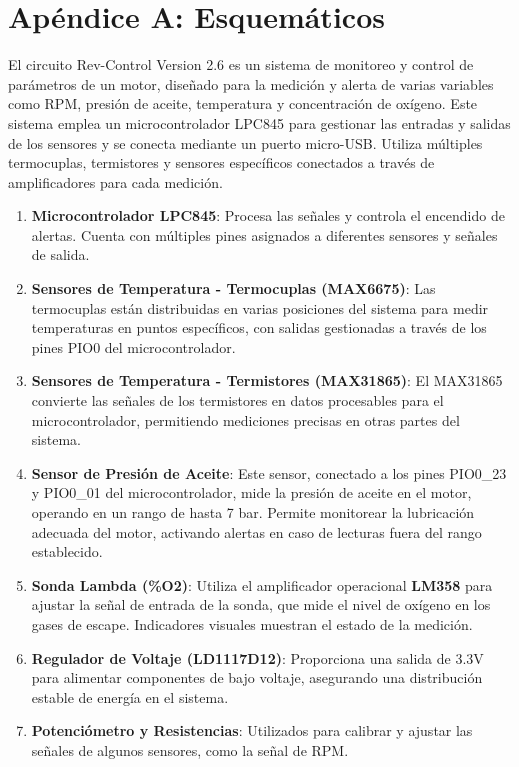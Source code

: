 \chapter{Apéndice A: Esquemáticos}
    El circuito Rev-Control Version 2.6 es un sistema de monitoreo y control de parámetros de un motor, diseñado para la medición y alerta de varias variables como RPM, presión de aceite, temperatura y concentración de oxígeno. Este sistema emplea un microcontrolador LPC845 para gestionar las entradas y salidas de los sensores y se conecta mediante un puerto micro-USB. Utiliza múltiples termocuplas, termistores y sensores específicos conectados a través de amplificadores para cada medición.\\

\begin{enumerate}
    \item \textbf{Microcontrolador LPC845}: Procesa las señales y controla el encendido de alertas. Cuenta con múltiples pines asignados a diferentes sensores y señales de salida.

    \item \textbf{Sensores de Temperatura - Termocuplas (MAX6675)}: Las termocuplas están distribuidas en varias posiciones del sistema para medir temperaturas en puntos específicos, con salidas gestionadas a través de los pines PIO0 del microcontrolador.

    \item \textbf{Sensores de Temperatura - Termistores (MAX31865)}: El MAX31865 convierte las señales de los termistores en datos procesables para el microcontrolador, permitiendo mediciones precisas en otras partes del sistema.

    \item \textbf{Sensor de Presión de Aceite}: Este sensor, conectado a los pines PIO0\_23 y PIO0\_01 del microcontrolador, mide la presión de aceite en el motor, operando en un rango de hasta 7 bar. Permite monitorear la lubricación adecuada del motor, activando alertas en caso de lecturas fuera del rango establecido.

    \item \textbf{Sonda Lambda (\%O2)}: Utiliza el amplificador operacional \textbf{LM358} para ajustar la señal de entrada de la sonda, que mide el nivel de oxígeno en los gases de escape. Indicadores visuales muestran el estado de la medición.

    \item \textbf{Regulador de Voltaje (LD1117D12)}: Proporciona una salida de 3.3V para alimentar componentes de bajo voltaje, asegurando una distribución estable de energía en el sistema.

    \item \textbf{Potenciómetro y Resistencias}: Utilizados para calibrar y ajustar las señales de algunos sensores, como la señal de RPM.
\end{enumerate}


